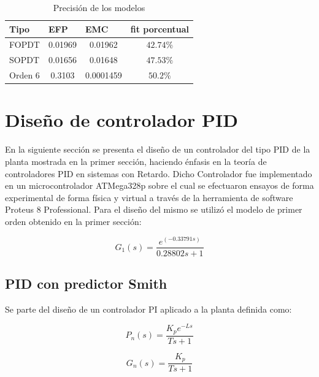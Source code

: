 \documentclass[letterpaper, 10 pt, conference]{ieeeconf}  %
\begin{document}
\begin{table}[H]
\centering
\begin{tabular}{|l|c|c|c|}
\hline
\textbf{Tipo} & \multicolumn{1}{l|}{\textbf{EFP}}     & \multicolumn{1}{l|}{\textbf{EMC}}     & \multicolumn{1}{l|}{\textbf{fit porcentual}} \\ \hline
FOPDT   & 0.01969                     & 0.01962                      & $42.74\%$                             \\ \hline
SOPDT   & 0.01656                     & 0.01648                      & $47.53\%$                            \\ \hline
Orden 6 & 0.3103                      & 0.0001459                    & $50.2\%$                             \\ \hline
\end{tabular}
  \caption{Precisión de los modelos}
  \label{tab:precision_modelos_prbs}
\end{table}

\section{Diseño de controlador PID}
En la siguiente sección se presenta el diseño de un controlador del tipo PID de la planta mostrada en la primer sección, haciendo énfasis en la teoría de controladores PID en sistemas con Retardo. Dicho Controlador fue implementado en un microcontrolador ATMega328p sobre el cual se efectuaron ensayos de forma experimental de forma física y virtual a través de la herramienta de software Proteus 8 Professional.
Para el diseño del mismo se utilizó el modelo de primer orden obtenido en la primer sección:

\begin{equation*}
  G_1(s) = \frac{e^{(-0.33791s)}}{0.28802s+1}
\end{equation*}

\subsection{PID con predictor Smith}
Se parte del diseño de un controlador PI aplicado a la planta definida como:

\begin{equation*}
  P_n(s) = \frac{K_{p}e^{-Ls}}{Ts+1}
\end{equation*}

\begin{equation*}
  G_n(s) = \frac{K_{p}}{Ts+1}
\end{equation*}
\end{document}

